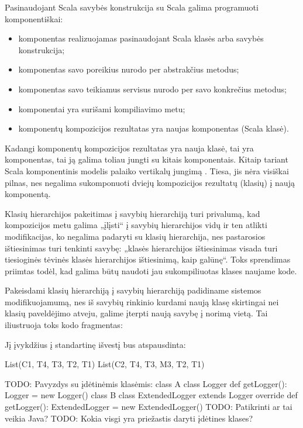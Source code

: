 Pasinaudojant Scala savybės konstrukcija su Scala galima programuoti
komponentiškai:
\begin{itemize}
  \item komponentas realizuojamas pasinaudojant Scala klasės arba
    savybės konstrukcija;
  \item komponentas savo poreikius nurodo per abstrakčius metodus;
  \item komponentas savo teikiamus servisus nurodo per savo konkrečius
    metodus;
  \item komponentai yra surišami kompiliavimo metu;
  \item komponentų kompozicijos rezultatas yra naujas komponentas
    (Scala klasė).
\end{itemize}
Kadangi komponentų kompozicijos rezultatas yra nauja klasė, tai yra
komponentas, tai ją galima toliau jungti su kitais komponentais.
Kitaip tariant Scala komponentinis modelis palaiko vertikalų
jungimą
\cite[598p.]{classification-framework-for-scm}.
Tiesa, jis nėra visiškai pilnas, nes negalima sukomponuoti dviejų
kompozicijos rezultatų (klasių) į naują komponentą.

Klasių hierarchijos pakeitimas į savybių hierarchiją turi privalumą,
kad kompozicijos metu galima „įlįsti“ į savybių hierarchijos vidų ir ten
atlikti modifikacijas, ko negalima padaryti su klasių hierarchija,
nes pastarosios ištiesinimas turi tenkinti savybę: „klasės hierarchijos
ištiesinimas visada turi tiesioginės tėvinės klasės hierarchijos
ištiesinimą, kaip galūnę“\cite[57p.]{scala-reference}. Toks sprendimas
priimtas todėl, kad galima būtų naudoti jau sukompiliuotas klases
naujame kode.

\begin{exmp}
  Pakeisdami klasių hierarchiją į savybių hierarchiją padidiname
  sistemos modifikuojamumą, nes iš savybių rinkinio kurdami naują
  klasę skirtingai nei klasių paveldėjimo atveju, galime įterpti
  naują savybę į norimą vietą. Tai iliustruoja toks kodo fragmentas:


  Jį įvykdžius į standartinę išvestį bus atspausdinta:

  \begin{textcode}
    List(C1, T4, T3, T2, T1)
    List(C2, T4, T3, M3, T2, T1)
  \end{textcode}

\end{exmp}


TODO: Pavyzdys su įdėtinėmis klasėmis:
class A {
  class Logger {}
  def getLogger(): Logger = new Logger()
}
class B {
  class ExtendedLogger extends Logger {}
  override def getLogger(): ExtendedLogger = new ExtendedLogger()
}
TODO: Patikrinti ar tai veikia Java?
TODO: Kokia visgi yra priežastis daryti įdėtines klases?


